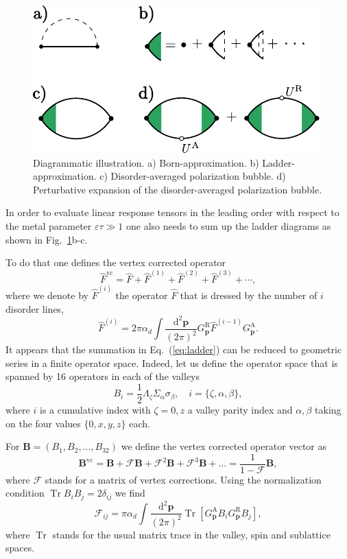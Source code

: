 \documentclass[%
  twocolumn,
  aps,
  prb,
  amsmath,
  amssymb,
  superscriptaddress,
  nofootinbib,
  floatfix
]{revtex4-1}
\newcommand{\be}{\begin{equation}}
\newcommand{\e}{\end{equation}}
\newcommand{\lt}{\left}
\newcommand{\rt}{\right}
\newcommand{\ep}{\varepsilon}
\newcommand{\bb}{\boldsymbol}
\newcommand{\0}{^{\phantom{\dagger}}}
\DeclareMathOperator{\tr}{Tr}
\begin{document}
\begin{figure}
\centering
\includegraphics{app5.pdf}
\caption{Diagrammatic illustration. a) Born-approximation. b) Ladder-approximation. c) Disorder-averaged polarization bubble. d) Perturbative expansion of the disorder-averaged polarization bubble. }
\label{fig:diagrams}
\end{figure}

In order to evaluate linear response tensors in the leading order with respect to the metal parameter $\ep\tau \gg 1$ one also needs to sum up the ladder diagrams as shown in Fig.~\ref{fig:diagrams}b-c.

To do that one defines the vertex corrected operator
\be
\label{eq:ladder}
\hat{F}^\text{vc}= \hat{F}+\hat{F}^{(1)} +\hat{F}^{(2)}+\hat{F}^{(3)}+\cdots,
\e
where we denote by $\hat{F}^{(i)}$ the operator $\hat{F}$ that is dressed by the number of $i$ disorder lines,
\be
\label{eq:onedisorderline}
\hat{F}^{(i)} = 2\pi\alpha_d\int\frac{\mathrm{d}^2\bb{p}}{(2\pi)^2} G_{\bb{p}}^\text{R}\hat{F}^{(i-1)}G_{\bb{p}}^\text{A}. 
\e
It appears that the summation in Eq.~(\ref{eq:ladder}) can be reduced to geometric series in a finite operator space. 
Indeed, let us define the operator space that is spanned by 16 operators in each of the valleys
\be
B_i=\frac{1}{2}\Lambda_\zeta\Sigma_\alpha \sigma_\beta,\quad i=\{\zeta,\alpha,\beta\},
\e
where $i$ is a cumulative index with $\zeta =0,z$ a valley parity index and $\alpha, \beta$ taking on the four values $\{0,x,y,z\}$ each. 

For $\bb{B}=(B_1, B_2,\dots, B_{32})$ we define the vertex corrected operator vector as 
\be
\label{sum}
\bb{B}^{\text{vc}}=\bb{B}+\mathcal{F}\bb{B}+\mathcal{F}^2\bb{B}+\mathcal{F}^3\bb{B}+\dots=
\frac{1}{1-\mathcal{F}}\bb{B},
\e
where $\mathcal{F}$ stands for a matrix of vertex corrections. Using the normalization condition $\tr B_i B_j =2\delta_{ij}$ 
we find
\be
\label{eq:matrixF}
\mathcal{F}_{ij} = \pi\alpha_d \int \frac{\mathrm{d}^2\bb{p}}{(2\pi)^2} 
\tr \lt[G^\text{A}_{\bb{p}} B_i G^\text{R}_{\bb{p}} B_j\rt],
\e
where $\tr$ stands for the usual matrix trace in the valley, spin and sublattice spaces.   
\end{document}
